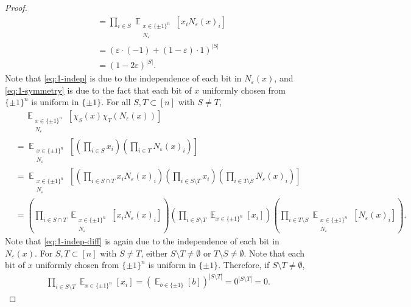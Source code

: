 \documentclass[letterpaper, reqno,11pt]{article}
\newcommand{\EE}{\mathop{{}\mathbb{E}}}
\begin{document}
\begin{enumerate}
\begin{proof}
\begin{align}
      &= \prod_{i \in S} \EE_{\substack{x \in \{ \pm 1 \}^n \\ N_\varepsilon}} \left[x_i N_\varepsilon(x)_i\right] \label{eq:1-indep} \\
      &= (\varepsilon \cdot (-1) + (1 - \varepsilon) \cdot 1)^{|S|} \label{eq:1-symmetry} \\
      &= (1 - 2\varepsilon)^{|S|}. \nonumber
    \end{align}
    Note that \eqref{eq:1-indep} is due to the independence of each bit in $N_\varepsilon(x)$, and \eqref{eq:1-symmetry} is due to the fact that each bit of $x$ uniformly chosen from $\{ \pm 1 \}^n$ is uniform in $\{ \pm 1 \}$. For all $S, T \subset [n]$ with $S \neq T$,
    \begin{align}
      &\quad\, \EE_{\substack{x \in \{ \pm 1 \}^n \\ N_\varepsilon}}\left[\chi_S(x) \chi_T\left(N_\varepsilon(x)\right)\right] \nonumber \\
      &= \EE_{\substack{x \in \{ \pm 1 \}^n \\ N_\varepsilon}} \left[\left(\prod_{i \in S} x_i\right)\left(\prod_{i \in T} N_\varepsilon(x)_i\right)\right] \nonumber \\
      &= \EE_{\substack{x \in \{ \pm 1 \}^n \\ N_\varepsilon}} \left[\left(\prod_{i \in S \cap T} x_i N_\varepsilon(x)_i\right) \left(\prod_{i \in S \setminus T} x_i\right)\left(\prod_{i \in T \setminus S} N_\varepsilon(x)_i\right)\right] \nonumber \\
      &= \left(\prod_{i \in S \cap T} \EE_{\substack{x \in \{ \pm 1 \}^n \\ N_\varepsilon}} \left[x_i N_\varepsilon(x)_i\right]\right) \left(\prod_{i \in S \setminus T} \EE_{x \in \{ \pm 1 \}^n}\left[x_i\right]\right) \left(\prod_{i \in T \setminus S} \EE_{\substack{x \in \{ \pm 1 \}^n \\ N_\varepsilon}}\left[N_\varepsilon(x)_i\right]\right). \label{eq:1-indep-diff}
    \end{align}
    Note that \eqref{eq:1-indep-diff} is again due to the independence of each bit in $N_\varepsilon(x)$. For $S, T \subset [n]$ with $S \neq T$, either $S \setminus T \neq \emptyset$ or $T \setminus S \neq \emptyset$. Note that each bit of $x$ uniformly chosen from $\{ \pm 1 \}^n$ is uniform in $\{ \pm 1 \}$. Therefore, if $S \setminus T \neq \emptyset$,
    \begin{align*}
      \prod_{i \in S \setminus T} \EE_{x \in \{ \pm 1 \}^n}\left[x_i\right] = \left(\EE_{b \in \{ \pm 1 \}}[b]\right)^{|S \setminus T|} = 0^{|S \setminus T|} = 0.

\end{align*}
\end{proof}
\end{enumerate}
\end{document}
